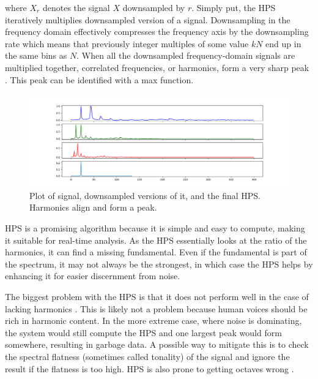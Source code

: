 where $X_r$ denotes the signal $X$ downsampled by $r$. Simply put, the HPS iteratively multiplies downsampled version of a signal. Downsampling in the frequency domain effectively compresses the frequency axis by the downsampling rate which means that previously integer multiples of some value $kN$ end up in the same bins as $N$. When all the downsampled frequency-domain signals are multiplied together, correlated frequencies, or harmonics, form a very sharp peak \cite{McLeod2008}. This peak can be identified with a max function.

\begin{figure}[ht]
    \centering
    \includegraphics[width=\textwidth]{./images/hps.png}
    \caption{Plot of signal, downsampled versions of it, and the final HPS. Harmonics align and form a peak. \label{fig:hps}}
\end{figure}

HPS is a promising algorithm because it is simple and easy to compute, making it suitable for real-time analysis. As the HPS essentially looks at the ratio of the harmonics, it can find a missing fundamental. Even if the fundamental is part of the spectrum, it may not always be the strongest, in which case the HPS helps by enhancing it for easier discernment from noise.

The biggest problem with the HPS is that it does not perform well in the case of lacking harmonics \cite{McLeod2008}. This is likely not  a problem because human voices should be rich in harmonic content. In the more extreme case, where noise is dominating, the system would still compute the HPS and one largest peak would form somewhere, resulting in garbage data. A possible way to mitigate this is to check the spectral flatness (sometimes called tonality) of the signal and ignore the result if the flatness is too high. HPS is also prone to getting octaves wrong \cite{Smyth2019}.

